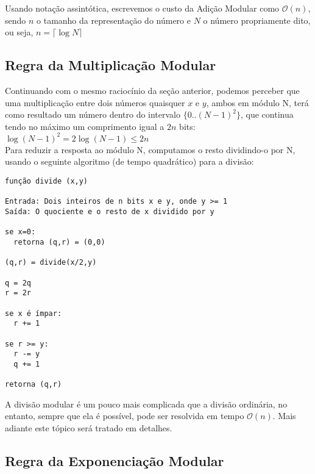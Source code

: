 Usando notação assintótica, escrevemos o custo da Adição Modular como
$\mathcal{O}(n)$, sendo $n$ o tamanho da representação do número e $N$ o
número propriamente dito, ou seja, $n = \lceil\log{} N\rceil$


\vspace{1.5em}
\subsection*{Regra da Multiplicação Modular}

Continuando com o mesmo raciocínio da seção anterior, podemos perceber que uma
multiplicação entre dois números quaisquer $x$ e $y$, ambos em módulo N, terá
como resultado um número dentro do intervalo $\{0..(N-1)^2\}$, que continua
tendo no máximo um comprimento igual a $2n$ bits:\\

$\log{(N-1)}^2 = 2\log{(N-1)} \leq 2n$\\

Para reduzir a resposta ao módulo N, computamos o resto dividindo-o por N,
usando o seguinte algoritmo (de tempo quadrático) para a divisão:

\begin{verbatim}
função divide (x,y)

Entrada: Dois inteiros de n bits x e y, onde y >= 1
Saída: O quociente e o resto de x dividido por y

se x=0:
  retorna (q,r) = (0,0)

(q,r) = divide(x/2,y)

q = 2q
r = 2r

se x é ímpar:
  r += 1

se r >= y:
  r -= y
  q += 1

retorna (q,r)
\end{verbatim}

A divisão modular é um pouco mais complicada que a divisão ordinária, no
entanto, sempre que ela é possível, pode ser resolvida em tempo
$\mathcal{O}(n)$. Mais adiante este tópico será tratado em detalhes.


\vspace{1.5em}
\subsection*{Regra da Exponenciação Modular}

